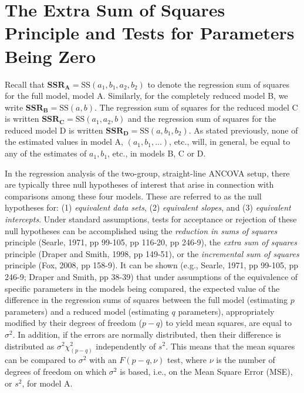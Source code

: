 \documentclass[11pt, oneside]{article}   	%
\begin{document}
\bigskip


\section{The Extra Sum of Squares Principle and Tests for Parameters Being Zero}

Recall that $ \mathbf{SSR_{A}} = \mbox{SS} (a_{1}, b_{1}, a_{2}, b_{2})  $ to denote the regression sum of squares for the full model, model A.  Similarly, for the completely reduced model B, we write $ \mathbf{SSR_{B}} = \mbox{SS} (a, b) $.  The regression sum of squares for the reduced model C is written $ \mathbf{SSR_{C}} = \mbox{SS} (a_{1}, a_{2}, b) $ and the regression sum of squares for the reduced model D is written $ \mathbf{SSR_{D}} = \mbox{SS} (a, b_{1}, b_{2})  $. As stated previously, none of the estimated values in model A, $  (a_{1}, b_{1}, ...)   $, etc., will, in general, be equal to any of the estimates of $ a_{1}, b_{1}  $, etc., in models B, C or D.  

\vspace{2 mm}

In the regression analysis of the two-group, straight-line ANCOVA setup, there are typically three null hypotheses of interest that arise in connection with comparisons among these four models.  These are referred to as the null hypotheses for: (1) \emph{equivalent data sets}, (2) \emph{equivalent slopes}, and (3) \emph{equivalent intercepts}.  Under standard assumptions, tests for acceptance or rejection of these null hypotheses can be accomplished using the \emph{reduction in sums of squares} principle (Searle, 1971, pp 99-105, pp 116-20, pp 246-9), the \emph{extra sum of squares} principle (Draper and Smith, 1998, pp 149-51), or the \emph{incremental sum of squares} principle (Fox, 2008, pp 158-9).  It can be shown (e.g., Searle, 1971, pp 99-105, pp 246-9; Draper and Smith, pp 38-39) that under assumptions of the equivalence of specific parameters in the models being compared, the expected value of the difference in the regression sums of squares between the full model (estimating $ p $ parameters) and a reduced model (estimating $ q $ parameters), appropriately modified by their degrees of freedom ($ p - q $) to yield mean squares, are equal to $ \sigma^{2} $.  In addition, if the errors are normally distributed, then their difference is distributed as  $ \sigma^{2} \chi^{2}_{(p-q)}  $ independently of $ s^{2}  $.  This means that the mean squares can be compared to $ \sigma^{2} $ with an $ F (p-q, \nu) $ test, where $ \nu $ is the number of degrees of freedom on which $ \sigma^{2} $ is based, i.e., on the Mean Square Error (MSE), or $ s^{2} $, for model A.    
\end{document}
